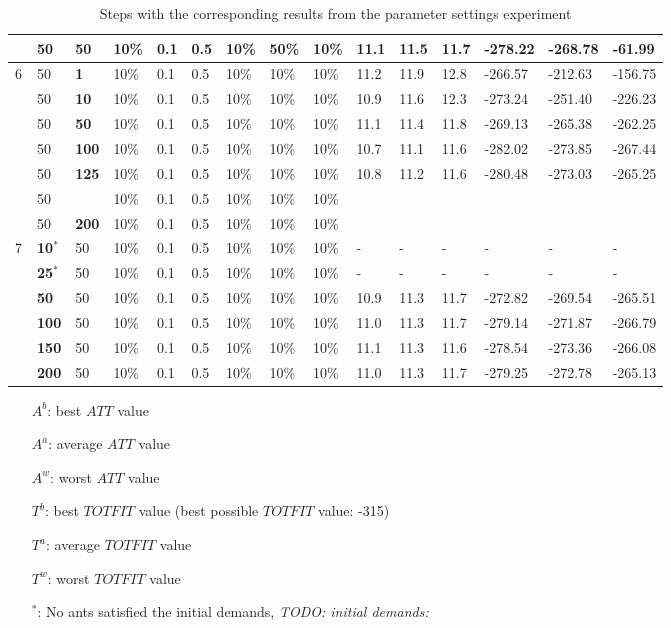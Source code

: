 \begin{table}
\begin{tabular}{|l|l|l|l|l|l|l|l|l||l|l|l|l|l|l|}
    ~ & 50 & 50 & 10\% & 0.1 & 0.5 & 10\% & \textbf{50\%} & 10\% & 11.1 & 11.5 & 11.7 & -278.22 & -268.78 & -61.99 \\
    \hline
    6 & 50 & \textbf{1} & 10\% & 0.1 & 0.5 & 10\% & 10\% & 10\% & 11.2 & 11.9 & 12.8 & -266.57 & -212.63 & -156.75 \\
    ~ & 50 & \textbf{10} & 10\% & 0.1 & 0.5 & 10\% & 10\% & 10\% & 10.9 & 11.6 & 12.3 & -273.24 & -251.40 & -226.23 \\
    ~ & 50 & \textbf{50} & 10\% & 0.1 & 0.5 & 10\% & 10\% & 10\% &  11.1 & 11.4 & 11.8 & -269.13 & -265.38 & -262.25 \\
    ~ & 50 & \textbf{100} & 10\% & 0.1 & 0.5 & 10\% & 10\% & 10\% & 10.7 & 11.1 & 11.6 & -282.02 & -273.85 & -267.44 \\
    ~ & 50 & \textbf{125} & 10\% & 0.1 & 0.5 & 10\% & 10\% & 10\% & 10.8 & 11.2 & 11.6 & -280.48 & -273.03 & -265.25 \\
    ~ & 50 & ~ & 10\% & 0.1 & 0.5 & 10\% & 10\% & 10\% & ~ & ~ & ~ & ~ & ~ & ~  \\
    ~ & 50 & \textbf{200} & 10\% & 0.1 & 0.5 & 10\% & 10\% & 10\% & ~ & ~ & ~ & ~ & ~ & ~  \\
    \hline
    7 & \textbf{10$^*$} & 50 & 10\% & 0.1 & 0.5 & 10\% & 10\% & 10\% & - & - & - & - & - & - \\
    ~ & \textbf{25$^*$} & 50 & 10\% & 0.1 & 0.5 & 10\% & 10\% & 10\% & - & - & - & - & - & - \\
    ~ & \textbf{50} & 50 & 10\% & 0.1 & 0.5 & 10\% & 10\% & 10\% & 10.9 & 11.3 & 11.7 & -272.82 & -269.54 & -265.51 \\
    ~ & \textbf{100} & 50 & 10\% & 0.1 & 0.5 & 10\% & 10\% & 10\% & 11.0 & 11.3 & 11.7 & -279.14 & -271.87 & -266.79 \\
    ~ & \textbf{150} & 50 & 10\% & 0.1 & 0.5 & 10\% & 10\% & 10\% & 11.1 & 11.3 & 11.6 & -278.54 & -273.36 & -266.08 \\
    ~ & \textbf{200} & 50 & 10\% & 0.1 & 0.5 & 10\% & 10\% & 10\% & 11.0 & 11.3 & 11.7 & -279.25 & -272.78 & -265.13 \\
    \hline
    \end{tabular}
    \caption {Steps with the corresponding results from the parameter settings experiment} 
    \begin{itemize}[noitemsep]
    \item[$A^b$:] best $ATT$ value
    \item[$A^a$:] average $ATT$ value
    \item[$A^w$:] worst $ATT$ value
    \item[$T^b$:] best $TOTFIT$ value (best possible $TOTFIT$ value: -315)
    \item[$T^a$:] average $TOTFIT$ value
    \item[$T^w$:] worst $TOTFIT$ value
    \item[$^*$:] No ants satisfied the initial demands, \emph{\color{blue} TODO: initial demands: }
    \end{itemize}
    \label{table:parameterSettings}
\end{table}

